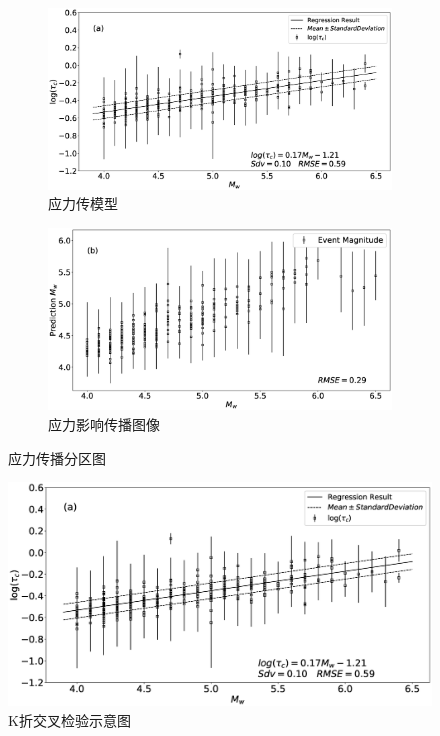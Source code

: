 \begin{figure}[ht]
  \centering
  \begin{subfigure}[b]{0.45\linewidth}
    \includegraphics[width=\linewidth]{img/7a.eps}
    \caption{应力传模型}\label{fig:yinglimoxin}
  \end{subfigure}
  \begin{subfigure}[b]{0.45\linewidth}
    \includegraphics[width=\linewidth]{img/7b.eps}
    \caption{应力影响传播图像}\label{fig:yinglichuanbotuxiang}
  \end{subfigure}
  \caption{应力传播分区图}
\end{figure}


 \begin{figure}[ht]
  \centering
  \includegraphics[width=\linewidth]{img/7a.eps}
  \caption{K折交叉检验示意图}\label{fig:yinglimoxin}
\end{figure}

